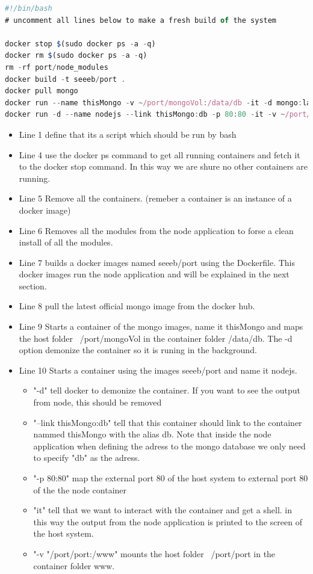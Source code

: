 \documentclass[a4paper,12pt,english]{article}
\begin{document}
\begin{lstlisting}[language=javascript]
#!/bin/bash
# uncomment all lines below to make a fresh build of the system

docker stop $(sudo docker ps -a -q)
docker rm $(sudo docker ps -a -q)
rm -rf port/node_modules
docker build -t seeeb/port .
docker pull mongo
docker run --name thisMongo -v ~/port/mongoVol:/data/db -it -d mongo:latest
docker run -d --name nodejs --link thisMongo:db -p 80:80 -it -v ~/port/port:/www seeeb/port
\end{lstlisting}
\begin{itemize}
\item Line 1 define that its a script which should be run by bash
\item Line 4 use the docker ps command to get all running containers and fetch it to the docker stop command. In this way we are shure no other containers are running.
\item Line 5 Remove all the containers. (remeber a container is an instance of a docker image)
\item Line 6 Removes all the modules from the node application to forse a clean install of all the modules.
\item Line 7 builds a docker images named seeeb/port using the Dockerfile. This docker images run the node application and will be explained in the next section.
\item Line 8 pull the latest official mongo image from the docker hub.
\item Line 9 Starts a container of the mongo images, name it thisMongo and maps the host folder ~/port/mongoVol in the container folder /data/db. The -d option demonize the container so it is runing in the background.
\item Line 10 Starts a container using the images seeeb/port and name it nodejs.
  \begin{itemize}
  \item "-d" tell docker to demonize the container. If you want to see the output from node, this should be removed
  \item "--link thisMongo:db" tell that this container should link to the container nammed thisMongo with the alias db. Note that inside the node application when defining the adress to the mongo database we only need to specify "db" as the adress.
  \item "-p 80:80" map the external port 80 of the host system to external port 80 of the the node container
  \item "it" tell that we want to interact with the container and get a shell. in this way the output from the node application is printed to the screen of the host system.
  \item "-v "/port/port:/www" mounts the host folder ~/port/port in the container folder www.
  \end{itemize} 
\end{itemize}
\end{document}
